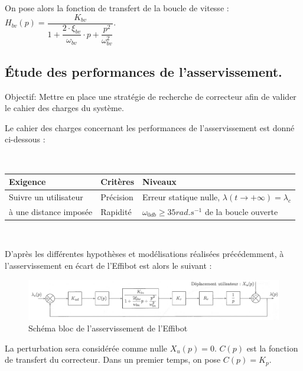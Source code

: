 On pose alors la fonction de transfert de la boucle de vitesse : $H_{bv}(p)=\dfrac{K_{bv}}{1+\dfrac{2\cdot\xi_{bv}}{\omega_{bv}}\cdot p+\dfrac{p^2}{\omega_{bv}^2}}$.

\subsection{Étude des performances de l'asservissement.}

Objectif: Mettre en place une stratégie de recherche de correcteur afin de valider le cahier des charges du système.

Le cahier des charges concernant les performances de l'asservissement est donné ci-dessous :

~\

\begin{tabular}{|l|l|l|}
\hline
Exigence & Critères & Niveaux \\
\hline
Suivre un utilisateur& Précision & Erreur statique nulle, $\lambda(t\rightarrow +\infty)=\lambda_c$\\
à une distance imposée & Rapidité & $\omega_{0db}\geq 35rad.s^{-1}$ de la boucle ouverte\\
\hline
\end{tabular}

~\


D'après les différentes hypothèses et modélisations réalisées précédemment,
à l'asservissement en écart de l'\og Effibot \fg est alors le suivant :


\begin{figure}[ht!]
\begin{center}
 \includegraphics[width=0.9\linewidth]{img/fig05}
\end{center}
\caption{Schéma bloc de l'asservissement de l'Effibot}
\label{fig05}
\end{figure}

La perturbation sera considérée comme nulle $X_u(p)=0$. $C(p)$ est la fonction de transfert du correcteur. Dans un premier temps, on pose $C(p)=K_p$.

